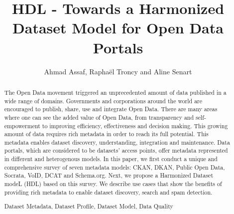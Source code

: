 \documentclass[runningheads,a4paper]{../../Tools/LaTEX/llncs}
\newcommand{\keywords}[1]{\par\addvspace\baselineskip
\noindent\keywordname\enspace\ignorespaces#1}
\begin{document}
\title{HDL - Towards a Harmonized Dataset Model for Open Data Portals}

\author{Ahmad Assaf, Rapha\"{e}l Troncy and Aline Senart}



\maketitle


\begin{abstract}
The Open Data movement triggered an unprecedented amount of data published in a wide range of domains. Governments and corporations around the world are encouraged to publish, share, use and integrate Open Data. There are many areas where one can see the added value of Open Data, from transparency and self-empowerment to improving efficiency, effectiveness and decision making. This growing amount of data requires rich metadata in order to reach its full potential. This metadata enables dataset discovery, understanding, integration and maintenance. Data portals, which are considered to be datasets' access points, offer metadata represented in different and heterogenous models. In this paper, we first conduct a unique and comprehensive survey of seven metadata models: CKAN, DKAN, Public Open Data, Socrata, VoID, DCAT and Schema.org. Next, we propose a Harmonized Dataset modeL (HDL) based on this survey. We describe use cases that show the benefits of providing rich metadata to enable dataset discovery, search and spam detection.

\keywords{Dataset Metadata, Dataset Profile, Dataset Model, Data Quality}
\end{abstract}

\end{document}

